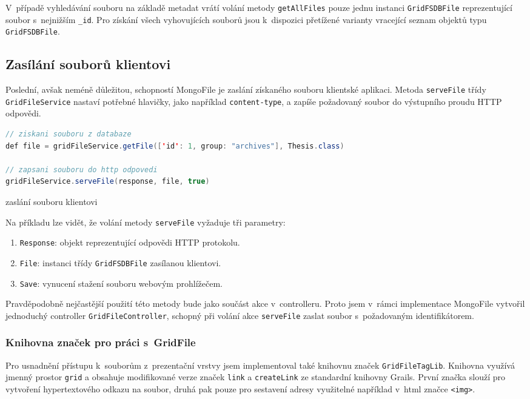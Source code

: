 V~případě vyhledávání souboru na základě metadat vrátí volání metody \texttt{getAllFiles} pouze jednu instanci \texttt{GridFSDBFile} reprezentující soubor s~nejnižším \texttt{\_id}. Pro získání všech vyhovujících souborů jsou k~dispozici přetížené varianty vracející seznam objektů typu \texttt{GridFSDBFile}.

\subsection{Zasílání souborů klientovi}
Poslední, avšak neméně důležitou, schopností MongoFile je zaslání získaného souboru klientské aplikaci. Metoda \texttt{serveFile} třídy \texttt{GridFileService} nastaví potřebné hlavičky, jako například \texttt{content-type}, a zapíše požadovaný soubor do výstupního proudu HTTP odpovědi.
\begin{example}
\centering
\begin{lstlisting}[language=Java]
// ziskani souboru z databaze
def file = gridFileService.getFile(['id': 1, group: "archives"], Thesis.class)

// zapsani souboru do http odpovedi
gridFileService.serveFile(response, file, true)
\end{lstlisting}
\caption{zaslání souboru klientovi}
\end{example}
Na příkladu lze vidět, že volání metody \texttt{serveFile} vyžaduje tři parametry:
\begin{enumerate}
\item \texttt{Response}: objekt reprezentující odpovědi HTTP protokolu.
\item \texttt{File}: instanci třídy \texttt{GridFSDBFile} zasílanou klientovi.
\item \texttt{Save}: vynucení stažení souboru webovým prohlížečem.
\end{enumerate}
Pravděpodobně nejčastější použití této metody bude jako součást akce v~controlleru. Proto jsem v~rámci implementace MongoFile vytvořil jednoduchý controller \texttt{GridFileController}, schopný při volání akce \texttt{serveFile} zaslat soubor s~požadovaným identifikátorem.

\subsubsection{\textbf{Knihovna značek pro práci s~GridFile}}
Pro usnadnění přístupu k~souborům z~prezentační vrstvy jsem implementoval také knihovnu značek \texttt{GridFileTagLib}. Knihovna využívá jmenný prostor \texttt{grid} a obsahuje modifikované verze značek \texttt{link} a \texttt{createLink} ze standardní knihovny Grails. První značka slouží pro vytvoření hypertextového odkazu na soubor, druhá pak pouze pro sestavení adresy využitelné například v~html značce \texttt{<img>}.

